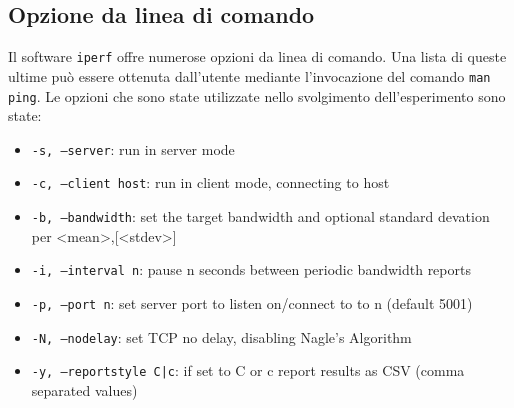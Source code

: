 \documentclass[a4paper,10pt]{article}
\begin{document}
\subsection{Opzione da linea di comando}
Il software \texttt{iperf} offre numerose opzioni da linea di comando. Una lista di queste ultime può essere ottenuta dall'utente mediante l'invocazione del comando \texttt{man ping}. Le opzioni che sono state utilizzate nello svolgimento dell'esperimento sono state:
\begin{itemize}
	\item \texttt{-s, --server}: run in server mode
	\item \texttt{-c, --client host}: run in client mode, connecting to host
	\item \texttt{-b, --bandwidth}: set the target bandwidth and optional standard devation per <mean>,[<stdev>]
	\item \texttt{-i, --interval n}: pause n seconds between periodic bandwidth reports
	\item \texttt{-p, --port n}: set server port to listen on/connect to to n (default 5001)
	\item \texttt{-N, --nodelay}: set TCP no delay, disabling Nagle's Algorithm
	\item \texttt{-y, --reportstyle C|c}: if set to C or c report results as CSV (comma separated values)
\end{itemize}
\end{document}
